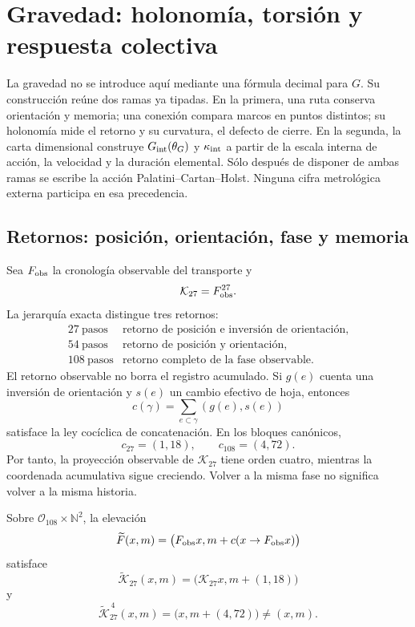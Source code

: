 \chapter{Gravedad: holonomía, torsión y respuesta colectiva}
\label{chap:gravedad}

La gravedad no se introduce aquí mediante una fórmula decimal para \(G\).
Su construcción reúne dos ramas ya tipadas. En la primera, una ruta conserva
orientación y memoria; una conexión compara marcos en puntos distintos; su
holonomía mide el retorno y su curvatura, el defecto de cierre. En la segunda,
la carta dimensional construye \(G_{\rm int}(\theta_G)\) y
\(\kappa_{\rm int}\) a partir de la escala interna de acción, la velocidad y
la duración elemental. Sólo después de disponer de ambas ramas se escribe la
acción Palatini--Cartan--Holst. Ninguna cifra metrológica externa participa en
esa precedencia.

\section{Retornos: posición, orientación, fase y memoria}

Sea \(F_{\rm obs}\) la cronología observable del transporte y
\[
 \mathcal K_{27}=F_{\rm obs}^{27}.
\]
La jerarquía exacta distingue tres retornos:
\[
 \begin{array}{c|c}
 27\ \text{pasos}&
 \text{retorno de posición e inversión de orientación},\\
 54\ \text{pasos}&
 \text{retorno de posición y orientación},\\
 108\ \text{pasos}&
 \text{retorno completo de la fase observable}.
 \end{array}
\]
El retorno observable no borra el registro acumulado.  Si \(g(e)\) cuenta
una inversión de orientación y \(s(e)\) un cambio efectivo de hoja, entonces
\[
 c(\gamma)=\sum_{e\subset\gamma}(g(e),s(e))
\]
satisface la ley cocíclica de concatenación.  En los bloques canónicos,
\[
 c_{27}=(1,18),\qquad c_{108}=(4,72).
\]
Por tanto, la proyección observable de \(\mathcal K_{27}\) tiene orden
cuatro, mientras la coordenada acumulativa sigue creciendo.  Volver a la
misma fase no significa volver a la misma historia.

\begin{theorem}
\label{thm:cobertura-retorno-grav-rev6}
Sobre \(\mathcal O_{108}\times\mathbb N^2\), la elevación
\[
 \widetilde F(x,m)=
 \bigl(F_{\rm obs}x,m+c(x\to F_{\rm obs}x)\bigr)
\]
satisface
\[
 \widetilde{\mathcal K}_{27}(x,m)
 =\bigl(\mathcal K_{27}x,m+(1,18)\bigr)
\]
y
\[
 \widetilde{\mathcal K}_{27}^{\,4}(x,m)
 =\bigl(x,m+(4,72)\bigr)\neq(x,m).
\]
\end{theorem}

